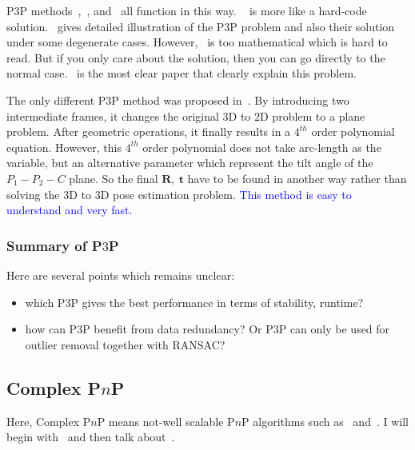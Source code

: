 \documentclass[a4paper]{article}
\begin{document}
P$3$P methods~\cite{fischler1981random},~\cite{gao2003complete}, and~\cite{li2011stable} all function in this way. ~\cite{fischler1981random} is more like a hard-code solution.~\cite{gao2003complete} gives detailed illustration of the P$3$P problem and also their solution under some degenerate cases. However,~\cite{gao2003complete} is too mathematical which is hard to read. But if you only care about the solution, then you can go directly to the normal case.~\cite{li2011stable} is the most clear paper that clearly explain this problem.


The only different P$3$P method was proposed in~\cite{kneip2011novel}. By introducing two intermediate frames, it changes the original $3$D to $2$D problem to a plane problem. After geometric operations, it finally results in a $4^{th}$ order polynomial equation. However, this $4^{th}$ order polynomial does not take arc-length as the variable, but an alternative parameter which represent the tilt angle of the $P_1-P_2-C$ plane. So the final $\mathbf{R},\ \mathbf{t}$ have to be found in another way rather than solving the $3$D to $3$D pose estimation problem. \textcolor{blue}{This method is easy to understand and very fast.}

\subsubsection{Summary of P$3$P}
Here are several points which remains unclear:
\begin{itemize}
\item which P$3$P gives the best performance in terms of stability, runtime?
\item how can P$3$P benefit from data redundancy? Or P$3$P can only be used for outlier removal together with RANSAC?
\end{itemize}

\subsection{Complex P$n$P}
Here, Complex P$n$P means not-well scalable P$n$P algorithms such as~\cite{quan1999linear} and~\cite{ansar2003linear}. I will begin with~\cite{quan1999linear} and then talk about~\cite{ansar2003linear}.
\end{document}
